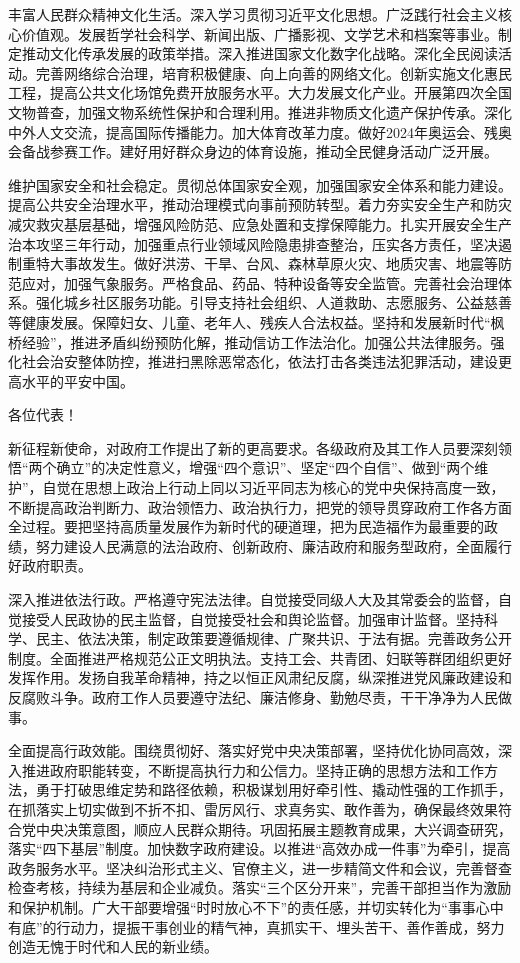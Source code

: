\documentclass[10pt, UTF8]{ctexbook} %
\begin{document}
丰富人民群众精神文化生活。深入学习贯彻习近平文化思想。广泛践行社会主义核心价值观。发展哲学社会科学、新闻出版、广播影视、文学艺术和档案等事业。制定推动文化传承发展的政策举措。深入推进国家文化数字化战略。深化全民阅读活动。完善网络综合治理，培育积极健康、向上向善的网络文化。创新实施文化惠民工程，提高公共文化场馆免费开放服务水平。大力发展文化产业。开展第四次全国文物普查，加强文物系统性保护和合理利用。推进非物质文化遗产保护传承。深化中外人文交流，提高国际传播能力。加大体育改革力度。做好2024年奥运会、残奥会备战参赛工作。建好用好群众身边的体育设施，推动全民健身活动广泛开展。

维护国家安全和社会稳定。贯彻总体国家安全观，加强国家安全体系和能力建设。提高公共安全治理水平，推动治理模式向事前预防转型。着力夯实安全生产和防灾减灾救灾基层基础，增强风险防范、应急处置和支撑保障能力。扎实开展安全生产治本攻坚三年行动，加强重点行业领域风险隐患排查整治，压实各方责任，坚决遏制重特大事故发生。做好洪涝、干旱、台风、森林草原火灾、地质灾害、地震等防范应对，加强气象服务。严格食品、药品、特种设备等安全监管。完善社会治理体系。强化城乡社区服务功能。引导支持社会组织、人道救助、志愿服务、公益慈善等健康发展。保障妇女、儿童、老年人、残疾人合法权益。坚持和发展新时代“枫桥经验”，推进矛盾纠纷预防化解，推动信访工作法治化。加强公共法律服务。强化社会治安整体防控，推进扫黑除恶常态化，依法打击各类违法犯罪活动，建设更高水平的平安中国。

各位代表！

新征程新使命，对政府工作提出了新的更高要求。各级政府及其工作人员要深刻领悟“两个确立”的决定性意义，增强“四个意识”、坚定“四个自信”、做到“两个维护”，自觉在思想上政治上行动上同以习近平同志为核心的党中央保持高度一致，不断提高政治判断力、政治领悟力、政治执行力，把党的领导贯穿政府工作各方面全过程。要把坚持高质量发展作为新时代的硬道理，把为民造福作为最重要的政绩，努力建设人民满意的法治政府、创新政府、廉洁政府和服务型政府，全面履行好政府职责。

深入推进依法行政。严格遵守宪法法律。自觉接受同级人大及其常委会的监督，自觉接受人民政协的民主监督，自觉接受社会和舆论监督。加强审计监督。坚持科学、民主、依法决策，制定政策要遵循规律、广聚共识、于法有据。完善政务公开制度。全面推进严格规范公正文明执法。支持工会、共青团、妇联等群团组织更好发挥作用。发扬自我革命精神，持之以恒正风肃纪反腐，纵深推进党风廉政建设和反腐败斗争。政府工作人员要遵守法纪、廉洁修身、勤勉尽责，干干净净为人民做事。

全面提高行政效能。围绕贯彻好、落实好党中央决策部署，坚持优化协同高效，深入推进政府职能转变，不断提高执行力和公信力。坚持正确的思想方法和工作方法，勇于打破思维定势和路径依赖，积极谋划用好牵引性、撬动性强的工作抓手，在抓落实上切实做到不折不扣、雷厉风行、求真务实、敢作善为，确保最终效果符合党中央决策意图，顺应人民群众期待。巩固拓展主题教育成果，大兴调查研究，落实“四下基层”制度。加快数字政府建设。以推进“高效办成一件事”为牵引，提高政务服务水平。坚决纠治形式主义、官僚主义，进一步精简文件和会议，完善督查检查考核，持续为基层和企业减负。落实“三个区分开来”，完善干部担当作为激励和保护机制。广大干部要增强“时时放心不下”的责任感，并切实转化为“事事心中有底”的行动力，提振干事创业的精气神，真抓实干、埋头苦干、善作善成，努力创造无愧于时代和人民的新业绩。
\end{document}
